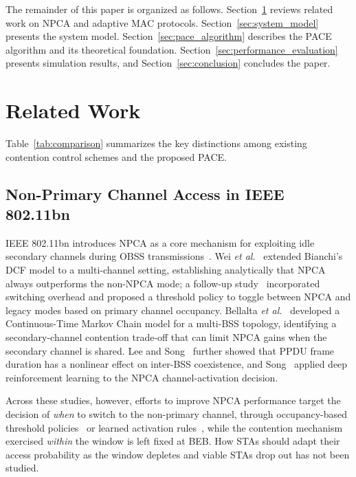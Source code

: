 \documentclass[conference]{IEEEtran}
\begin{document}
The remainder of this paper is organized as follows.
Section~\ref{sec:related_work} reviews related work on NPCA and adaptive MAC protocols. Section~\ref{sec:system_model} presents the system
model. Section~\ref{sec:pace_algorithm} describes the PACE algorithm and its
theoretical foundation. Section~\ref{sec:performance_evaluation} presents simulation
results, and Section~\ref{sec:conclusion} concludes the paper.

\section{Related Work}
\label{sec:related_work}

Table~\ref{tab:comparison} summarizes the key distinctions among existing
contention control schemes and the proposed PACE.

\subsection{Non-Primary Channel Access in IEEE 802.11bn}

IEEE 802.11bn introduces NPCA as a core mechanism for exploiting idle
secondary channels during OBSS transmissions~\cite{ieee80211bn,galati2024will}.
Wei \textit{et al.}~\cite{wei2024non} extended Bianchi's DCF model to a
multi-channel setting, establishing analytically that NPCA always outperforms
the non-NPCA mode; a follow-up study~\cite{wei2024optimized} incorporated
switching overhead and proposed a threshold policy to toggle between NPCA
and legacy modes based on primary channel occupancy. Bellalta
\textit{et al.}~\cite{bellalta2025performance} developed a Continuous-Time
Markov Chain model for a multi-BSS topology, identifying a secondary-channel
contention trade-off that can limit NPCA gains when the secondary channel
is shared. Lee and Song~\cite{lee2024impact} further showed that PPDU frame
duration has a nonlinear effect on inter-BSS coexistence, and Song~\cite{song2026adaptive}
applied deep reinforcement learning to the NPCA channel-activation decision.

Across these studies, however, efforts to improve NPCA performance target
the decision of \emph{when} to switch to the non-primary channel, through
occupancy-based threshold policies~\cite{wei2024optimized} or learned
activation rules~\cite{song2026adaptive}, while the contention mechanism
exercised \emph{within} the window is left fixed at BEB. How STAs should
adapt their access probability as the window depletes and viable STAs
drop out has not been studied.
\end{document}
